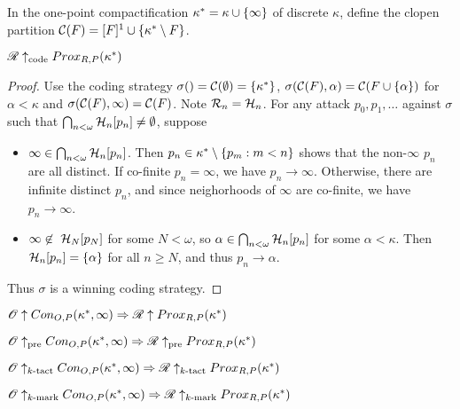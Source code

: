 \begin{definition}
  In the one-point compactification $\kappa^*=\kappa\cup\{\infty\}$ of discrete $\kappa$, define the clopen partition $\mathcal{C}(F) = [F]^1\cup\{\kappa^*\setminus F\}$.
\end{definition}

\begin{theorem}
  $\mathscr{R}\uparrow_{\text{code}}Prox_{R,P}(\kappa^*)$
\end{theorem}

\begin{proof}
  Use the coding strategy $\sigma()=\mathcal{C}(\emptyset)=\{\kappa^*\}$, $\sigma(\mathcal{C}(F),\alpha)=\mathcal{C}(F\cup\{\alpha\})$ for $\alpha<\kappa$ and $\sigma(\mathcal{C}(F),\infty)=\mathcal{C}(F)$. Note $\mathcal{R}_n=\mathcal{H}_n$. For any attack $p_0,p_1,\dots$ against $\sigma$ such that $\bigcap_{n<\omega} \mathcal{H}_n[p_n]\not=\emptyset$, suppose 
    \begin{itemize}
      \item $\infty\in\bigcap_{n<\omega} \mathcal{H}_n[p_n]$. Then $p_n\in \kappa^*\setminus\{p_m:m<n\}$ shows that the non-$\infty$ $p_n$ are all distinct. If co-finite $p_n=\infty$, we have $p_n\to\infty$. Otherwise, there are infinite distinct $p_n$, and since neighorhoods of $\infty$ are co-finite, we have $p_n\to\infty$.
      \item $\infty\not\in\ \mathcal{H}_N[p_N]$ for some $N<\omega$, so $\alpha\in\bigcap_{n<\omega} \mathcal{H}_n[p_n]$ for some $\alpha<\kappa$. Then $\mathcal{H}_n[p_n]=\{\alpha\}$ for all $n\geq N$, and thus $p_n\to\alpha$.
    \end{itemize}
  Thus $\sigma$ is a winning coding strategy.
\end{proof}

\begin{theorem}
$\mathscr{O}\uparrow Con_{O,P}(\kappa^*,\infty) \Rightarrow \mathscr{R} \uparrow Prox_{R,P}(\kappa^*)$

$\mathscr{O}\uparrow_{\text{pre}} Con_{O,P}(\kappa^*,\infty) \Rightarrow \mathscr{R} \uparrow_{\text{pre}} Prox_{R,P}(\kappa^*)$

$\mathscr{O}\uparrow_{k\text{-tact}} Con_{O,P}(\kappa^*,\infty) \Rightarrow \mathscr{R} \uparrow_{k\text{-tact}} Prox_{R,P}(\kappa^*)$

$\mathscr{O}\uparrow_{k\text{-mark}} Con_{O,P}(\kappa^*,\infty) \Rightarrow \mathscr{R} \uparrow_{k\text{-mark}} Prox_{R,P}(\kappa^*)$
\end{theorem}

